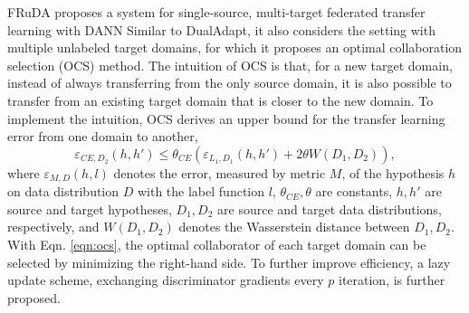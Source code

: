 \documentclass[11pt]{article}
\begin{document}
FRuDA \cite{Yilun-gan2022fruda} proposes a system for single-source, multi-target federated transfer learning with DANN \cite{Yilun-ganin2016domain} Similar to DualAdapt, it also considers the setting with multiple unlabeled target domains, for which it proposes an optimal collaboration selection (OCS) method. The intuition of OCS is that, for a new target domain, instead of always transferring from the only source domain, it is also possible to transfer from an existing target domain that is closer to the new domain. To implement the intuition, OCS derives an upper bound for the transfer learning error from one domain to another,
\begin{equation}
    \varepsilon_{CE, D_2}(h, h') \le \theta_{CE}(\varepsilon_{L_1, D_1}(h, h') + 2\theta W(D_1, D_2)),
    \label{eqn:ocs}
\end{equation}
where $\varepsilon_{M, D}(h, l)$ denotes the error, measured by metric $M$, of the hypothesis $h$ on data distribution $D$ with the label function $l$, $\theta_{CE}, \theta$ are constants, $h, h'$ are source and target hypotheses, $D_1, D_2$ are source and target data distributions, respectively, and $W(D_1, D_2)$ denotes the Wasserstein distance between $D_1, D_2$. With Eqn. \ref{eqn:ocs}, the optimal collaborator of each target domain can be selected by minimizing the right-hand side. To further improve efficiency, a lazy update scheme, exchanging discriminator gradients every $p$ iteration, is further proposed.
\end{document}
